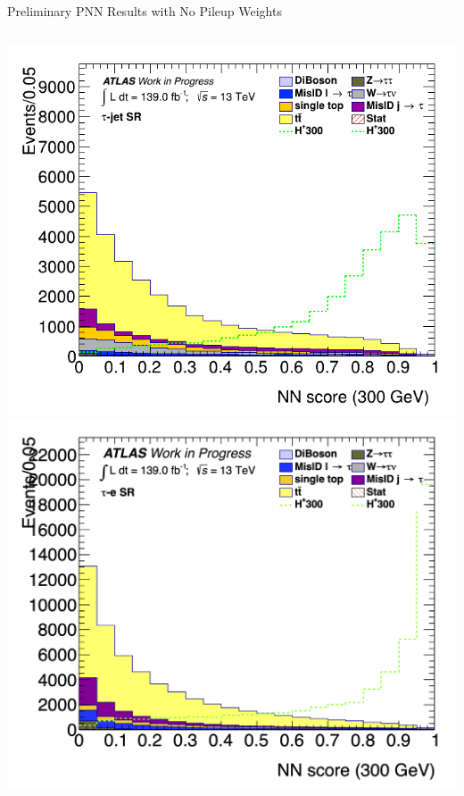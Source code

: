 \documentclass[aspectratio=169,xcolor=table]{beamer}
\begin{document}
\begin{frame}{Preliminary PNN Results with No Pileup Weights}
\begin{columns}
        \includegraphics[height=.4\textheight,keepaspectratio=true]{Scores/taujet/rnnTest_1p_3p_noweight/clf_score_GB200_mass_300to300_SR_TAUJET.png}
        \includegraphics[height=.4\textheight,keepaspectratio=true]{Scores/taulep/myOutDirClfEval_1p_noUpsilon_test_full/clf_score_GB200_mass_300to300_SR_TAUEL.png}


      \end{columns}
    \end{frame}
\end{document}
